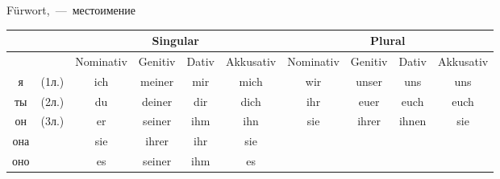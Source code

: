 
 F\"urwort,~---~местоимение

\begin{tabular}{|cc|c|c|c|c|c|c|c|c|}
\hline
 & & \multicolumn{4}{|c|}{Singular} & \multicolumn{4}{|c|}{Plural} \\
\hline
 & & Nominativ & Genitiv & Dativ & Akkusativ & Nominativ & Genitiv & Dativ & Akkusativ \\
\hline
я & (1л.) & ich & meiner & mir & mich & wir & unser & uns & uns \\
\hline
ты & (2л.) & du & deiner & dir & dich & ihr & euer & euch & euch \\
\hline
он & \multirow{3}{*}{(3л.)} & er & seiner & ihm & ihn & \multirow{3}{*}{sie} & \multirow{3}{*}{ihrer} & \multirow{3}{*}{ihnen} & \multirow{3}{*}{sie} \\
она & & sie & ihrer & ihr & sie & & & & \\
оно & & es & seiner & ihm & es & & & & \\
\hline
\end{tabular}
